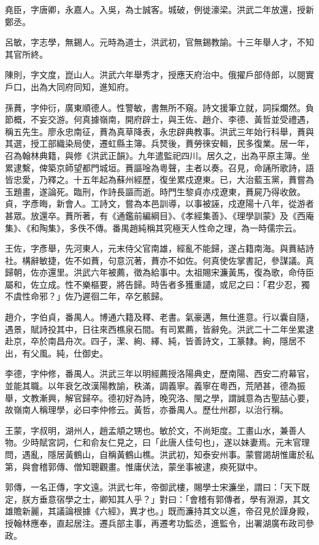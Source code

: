 \begin{pinyinscope}
堯臣，字唐卿，永嘉人。入吳，為士誠客。城破，例徙濠梁。洪武二年放還，授新鄭丞。

呂敏，字志學，無錫人。元時為道士，洪武初，官無錫教諭。十三年舉人才，不知其官所終。

陳則，字文度，崑山人。洪武六年舉秀才，授應天府治中。俄擢戶部侍郎，以閱實戶口，出為大同府同知，進知府。

孫蕡，字仲衍，廣東順德人。性警敏，書無所不窺。詩文援筆立就，詞採爛然。負節概，不妄交游。何真據嶺南，開府辟士，與王佐、趙介、李德、黃哲並受禮遇，稱五先生。廖永忠南征，蕡為真草降表，永忠辟典教事。洪武三年始行科舉，蕡與其選，授工部織染局使，遷虹縣主簿。兵燹後，蕡勞徠安輯，民多復業。居一年，召為翰林典籍，與修《洪武正韻》。九年遣監祀四川。居久之，出為平原主簿。坐累逮繫，俾築京師望都門城垣。蕡謳唫為粵聲，主者以奏。召見，命誦所歌詩，語皆忠愛，乃釋之。十五年起為蘇州經歷，復坐累戍遼東。已，大治藍玉黨，蕡嘗為玉題畫，遂論死。臨刑，作詩長謳而逝。時門生黎貞亦戍遼東，蕡屍乃得收斂。貞，字彥晦，新會人。工詩文，嘗為本邑訓導，以事被誣，戍遼陽十八年，從游者甚眾。放還卒。蕡所著，有《通鑑前編綱目》、《孝經集善》、《理學訓蒙》及《西庵集》、《和陶集》，多佚不傳。番禺趙純稱其究極天人性命之理，為一時儒宗云。

王佐，字彥舉，先河東人，元末侍父官南雄，經亂不能歸，遂占籍南海。與蕡結詩社。構辭敏捷，佐不如蕡，句意沉著，蕡亦不如佐。何真使佐掌書記，參謀議。真歸朝，佐亦還里。洪武六年被薦，徵為給事中。太祖賜宋濂黃馬，復為歌，命侍臣屬和，佐立成。性不樂樞要，將告歸。時告者多獲重譴，或尼之曰：「君少忍，獨不虞性命邪？」佐乃遲徊二年，卒乞骸歸。

趙介，字伯貞，番禺人。博通六籍及釋、老書。氣豪邁，無仕進意。行以囊自隨，遇景，賦詩投其中，日往來西樵泉石間。有司累薦，皆辭免。洪武二十二年坐累逮赴京，卒於南昌舟次。四子，潔、絢、繹、純，皆善詩文，工篆隸。絢，隱居不出，有父風。純，仕御史。

李德，字仲修，番禺人。洪武三年以明經薦授洛陽典史，歷南陽、西安二府幕官，並能其職。以年衰乞改漢陽教諭，秩滿，調義寧。義寧在粵西，荒陋甚，德為振舉，文教漸興，解官歸卒。德初好為詩，晚究洛、閩之學，謂誠意為古聖喆心要，故嶺南人稱理學，必曰李仲修云。黃哲，亦番禺人。歷仕州郡，以治行稱。

王蒙，字叔明，湖州人，趙孟頫之甥也。敏於文，不尚矩度。工畫山水，兼善人物。少時賦宮詞，仁和俞友仁見之，曰「此唐人佳句也」，遂以妹妻焉。元末官理問，遇亂，隱居黃鶴山，自稱黃鶴山樵。洪武初，知泰安州事。蒙嘗謁胡惟庸於私第，與會稽郭傳、僧知聰觀畫。惟庸伏法，蒙坐事被逮，瘐死獄中。

郭傳，一名正傳，字文遠。洪武七年，帝御武樓，賜學士宋濂坐，謂曰：「天下既定，朕方垂意宿學之士，卿知其人乎？」對曰：「會稽有郭傳者，學有淵源，其文雄贍新麗，其議論根據《六經》，異才也。」既而濂持其文以進，帝召見於謹身殿，授翰林應奉，直起居注。遷兵部主事，再遷考功監丞，進監令，出署湖廣布政司參政。


\end{pinyinscope}